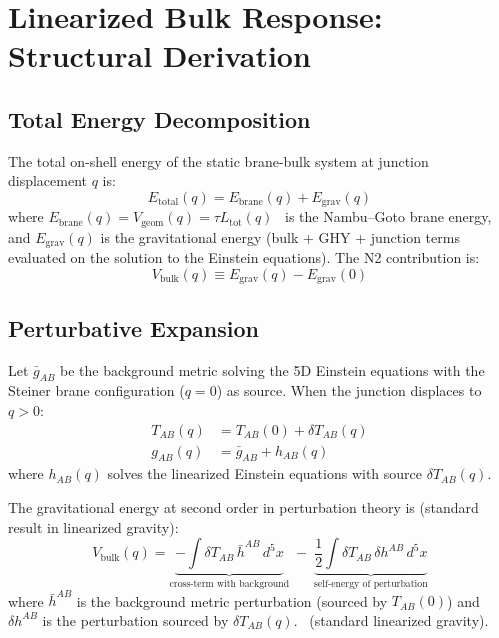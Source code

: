 \section{Linearized Bulk Response: Structural Derivation}
\label{sec:P2N2:derivation}

\subsection{Total Energy Decomposition}

The total on-shell energy of the static brane-bulk system at junction
displacement $q$ is:
\begin{equation}
    E_{\mathrm{total}}(q) = E_{\mathrm{brane}}(q) + E_{\mathrm{grav}}(q)
    \label{eq:N2_Etotal}
\end{equation}
where $E_{\mathrm{brane}}(q) = V_{\mathrm{geom}}(q) = \tau L_{\mathrm{tot}}(q)$
\tagDc\ is the Nambu--Goto brane energy, and $E_{\mathrm{grav}}(q)$ is the
gravitational energy (bulk + GHY + junction terms evaluated on the
solution to the Einstein equations). The N2 contribution is:
\begin{equation}
    V_{\mathrm{bulk}}(q) \equiv E_{\mathrm{grav}}(q) - E_{\mathrm{grav}}(0)
    \label{eq:N2_Vbulk_def}
\end{equation}

\subsection{Perturbative Expansion}

Let $\bar{g}_{AB}$ be the background metric solving the 5D Einstein
equations with the Steiner brane configuration ($q = 0$) as source.
When the junction displaces to $q > 0$:
\begin{align}
    T_{AB}(q) &= T_{AB}(0) + \delta T_{AB}(q) \label{eq:N2_deltaT} \\
    g_{AB}(q) &= \bar{g}_{AB} + h_{AB}(q) \label{eq:N2_deltag}
\end{align}
where $h_{AB}(q)$ solves the linearized Einstein equations with
source $\delta T_{AB}(q)$.

The gravitational energy at second order in perturbation theory is
(standard result in linearized gravity):
\begin{equation}
    V_{\mathrm{bulk}}(q) = \underbrace{-\int \delta T_{AB}\, \bar{h}^{AB}\,
    d^5x}_{\text{cross-term with background}} \;-\;
    \underbrace{\frac{1}{2}\int \delta T_{AB}\, \delta h^{AB}\,
    d^5x}_{\text{self-energy of perturbation}}
    \label{eq:N2_Vbulk_perturbative}
\end{equation}
where $\bar{h}^{AB}$ is the background metric perturbation (sourced by
$T_{AB}(0)$) and $\delta h^{AB}$ is the perturbation sourced by
$\delta T_{AB}(q)$. \tagDc\ (standard linearized gravity).

